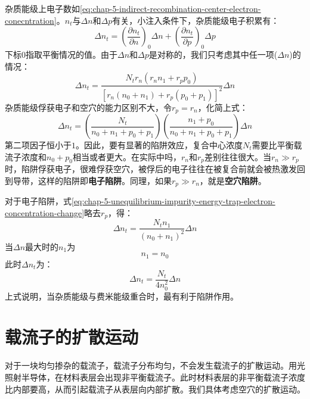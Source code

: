 杂质能级上电子数如\autoref{eq:chap-5-indirect-recombination-center-electron-conecntration}。$n_t$与$\Delta n$和$\Delta p$有关，小注入条件下，杂质能级电子积累有：
\begin{equation}
    \Delta n_t=\left(\frac{\partial n_t}{\partial n}\right)_0\Delta n+\left(\frac{\partial n_t}{\partial p}\right)_0\Delta p
\end{equation}
下标$0$指取平衡情况的值。由于$\Delta n$和$\Delta p$是对称的，我们只考虑其中任一项($\Delta n$)的情况：
\begin{equation}
    \Delta n_t=\frac{N_tr_n\left(r_nn_1+r_pp_0\right)}{\left[r_n(n_0+n_1)+r_p(p_0+p_1)\right]^2}\Delta n\label{eq:chap-5-unequilibrium-impurity-energy-trap-electron-concentration-change}
\end{equation}
杂质能级俘获电子和空穴的能力区别不大，令$r_p=r_n$，化简上式：
\begin{equation}
    \Delta n_t=\left(\frac{N_t}{n_0+n_1+p_0+p_1}\right)\left(\frac{n_1+p_0}{n_0+n_1+p_0+p_1}\right)\Delta n
\end{equation}
第二项因子恒小于$1$。因此，要有显著的陷阱效应，复合中心浓度$N_t$需要比平衡载流子浓度和$n_0+p_0$相当或者更大。在实际中吗，$r_n$和$r_p$差别往往很大。当$r_n\gg r_p$时，陷阱俘获电子，很难俘获空穴，被俘后的电子往往在被复合前就会被热激发回到导带，这样的陷阱即\textbf{电子陷阱}。同理，如果$r_p\gg r_n$，就是\textbf{空穴陷阱}。

对于电子陷阱，式\autoref{eq:chap-5-unequilibrium-impurity-energy-trap-electron-concentration-change}略去$r_p$，得：
\begin{equation}
    \Delta n_t=\frac{N_tn_1}{\left(n_0+n_1\right)^2}\Delta n
\end{equation}
当$\Delta n$最大时的$n_1$为
\begin{equation}
    n_1=n_0
\end{equation}
此时$\Delta n_t$为：
\begin{equation}
    \Delta n_t=\frac{N_t}{4n_0^2}\Delta n
\end{equation}
上式说明，当杂质能级与费米能级重合时，最有利于陷阱作用。

\section{载流子的扩散运动}\label{sec:semi-diffusion}

对于一块均匀掺杂的载流子，载流子分布均匀，不会发生载流子的扩散运动。用光照射半导体，在材料表层会出现非平衡载流子。此时材料表层的非平衡载流子浓度比内部要高，从而引起载流子从表层向内部扩散。我们具体考虑空穴的扩散运动。

